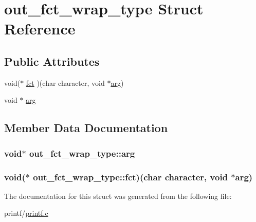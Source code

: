 \hypertarget{structout__fct__wrap__type}{\section{out\-\_\-fct\-\_\-wrap\-\_\-type Struct Reference}
\label{structout__fct__wrap__type}
}
\subsection*{Public Attributes}
\begin{DoxyCompactItemize}
\item 
void($\ast$ \hyperlink{structout__fct__wrap__type_a199f2657cebba34be43baf497cc5f3f0}{fct} )(char character, void $\ast$\hyperlink{structout__fct__wrap__type_ad099c5ee9191dcfb95a86451ced50382}{arg})
\item 
void $\ast$ \hyperlink{structout__fct__wrap__type_ad099c5ee9191dcfb95a86451ced50382}{arg}
\end{DoxyCompactItemize}


\subsection{Member Data Documentation}
\hypertarget{structout__fct__wrap__type_ad099c5ee9191dcfb95a86451ced50382}{
\subsubsection[{arg}]{\setlength{\rightskip}{0pt plus 5cm}void$\ast$ out\-\_\-fct\-\_\-wrap\-\_\-type\-::arg}}\label{structout__fct__wrap__type_ad099c5ee9191dcfb95a86451ced50382}
\hypertarget{structout__fct__wrap__type_a199f2657cebba34be43baf497cc5f3f0}{
\subsubsection[{fct}]{\setlength{\rightskip}{0pt plus 5cm}void($\ast$ out\-\_\-fct\-\_\-wrap\-\_\-type\-::fct)(char character, void $\ast${\bf arg})}}\label{structout__fct__wrap__type_a199f2657cebba34be43baf497cc5f3f0}


The documentation for this struct was generated from the following file\-:\begin{DoxyCompactItemize}
\item 
printf/\hyperlink{printf_8c}{printf.\-c}\end{DoxyCompactItemize}
